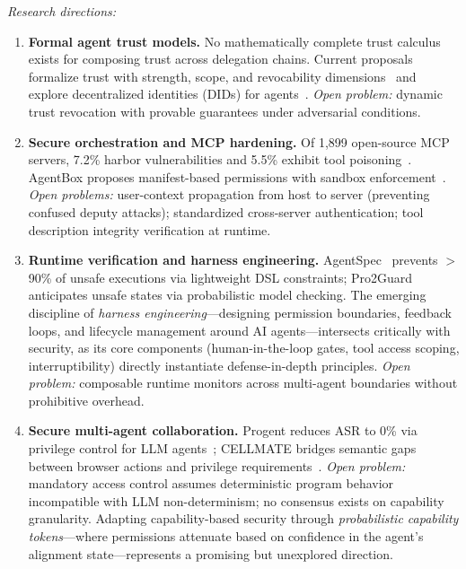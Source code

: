 \emph{Research directions:}
\begin{enumerate}[nosep,leftmargin=1.5em]
    \item \textbf{Formal agent trust models.} No mathematically complete trust calculus exists for composing trust across delegation chains. Current proposals formalize trust with strength, scope, and revocability dimensions~\cite{trustparadox2025} and explore decentralized identities (DIDs) for agents~\cite{rodriguez2025did}. \emph{Open problem:} dynamic trust revocation with provable guarantees under adversarial conditions.
    \item \textbf{Secure orchestration and MCP hardening.} Of 1,899 open-source MCP servers, 7.2\% harbor vulnerabilities and 5.5\% exhibit tool poisoning~\cite{hasan2025mcpglance}. AgentBox proposes manifest-based permissions with sandbox enforcement~\cite{buhler2025agentbox}. \emph{Open problems:} user-context propagation from host to server (preventing confused deputy attacks); standardized cross-server authentication; tool description integrity verification at runtime.
    \item \textbf{Runtime verification and harness engineering.} AgentSpec~\cite{wang2025agentspec} prevents $>$90\% of unsafe executions via lightweight DSL constraints; Pro2Guard~\cite{pro2guard2025} anticipates unsafe states via probabilistic model checking. The emerging discipline of \emph{harness engineering}---designing permission boundaries, feedback loops, and lifecycle management around AI agents---intersects critically with security, as its core components (human-in-the-loop gates, tool access scoping, interruptibility) directly instantiate defense-in-depth principles. \emph{Open problem:} composable runtime monitors across multi-agent boundaries without prohibitive overhead.
    \item \textbf{Secure multi-agent collaboration.} Progent reduces ASR to 0\% via privilege control for LLM agents~\cite{shi2025progent}; CELLMATE bridges semantic gaps between browser actions and privilege requirements~\cite{meng2025cellmate}. \emph{Open problem:} mandatory access control assumes deterministic program behavior incompatible with LLM non-determinism; no consensus exists on capability granularity. Adapting capability-based security through \emph{probabilistic capability tokens}---where permissions attenuate based on confidence in the agent's alignment state---represents a promising but unexplored direction.
\end{enumerate}


